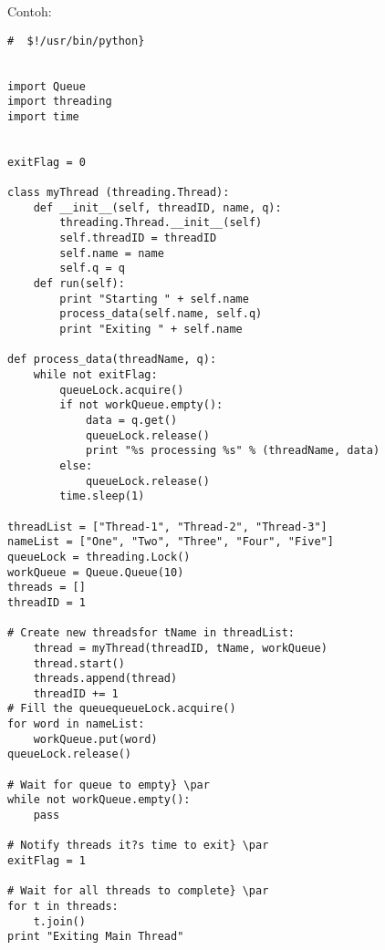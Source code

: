 \documentclass [12pt,a4paper,notitlepage,oneside,bahasa]{article}
\begin{document}
\vspace{12pt}
Contoh:  
\begin{verbatim}
#  $!/usr/bin/python}  


import Queue
import threading
import time


exitFlag = 0

class myThread (threading.Thread):
    def __init__(self, threadID, name, q):
        threading.Thread.__init__(self)
        self.threadID = threadID
        self.name = name
        self.q = q
    def run(self):
        print "Starting " + self.name
        process_data(self.name, self.q)
        print "Exiting " + self.name

def process_data(threadName, q):
    while not exitFlag:
        queueLock.acquire()
        if not workQueue.empty():
            data = q.get()
            queueLock.release()
            print "%s processing %s" % (threadName, data)
        else:
            queueLock.release()
        time.sleep(1)

threadList = ["Thread-1", "Thread-2", "Thread-3"]
nameList = ["One", "Two", "Three", "Four", "Five"]
queueLock = threading.Lock()
workQueue = Queue.Queue(10)
threads = []
threadID = 1

# Create new threadsfor tName in threadList:
    thread = myThread(threadID, tName, workQueue)
    thread.start()
    threads.append(thread)
    threadID += 1
# Fill the queuequeueLock.acquire()
for word in nameList:
    workQueue.put(word)
queueLock.release()

# Wait for queue to empty} \par
while not workQueue.empty():
    pass
    
# Notify threads it?s time to exit} \par
exitFlag = 1

# Wait for all threads to complete} \par
for t in threads:
    t.join()
print "Exiting Main Thread"
\end{verbatim}
\end{document}
